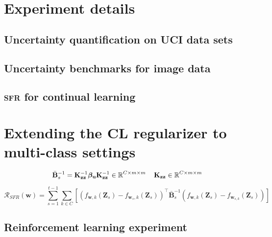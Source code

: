 \documentclass{article}
\newcommand{\our}{\textsc{sfr}\xspace}
\newcommand{\mathbold}[1]{\bm{#1}}
\newcommand{\mbf}[1]{\mathbf{#1}}
\newcommand{\MB}{\mbf{B}}
\newcommand{\MZ}{\mbf{Z}}
\newcommand{\T}{\top}
\newcommand{\vbeta}[0]{\mathbold{\beta}}
\newcommand{\vu}{\mbf{u}}
\newcommand{\vw}{\mbf{w}}
\newcommand{\MKzz}{\mbf{K}_{\mbf{z}\mbf{z}}}
\begin{document}
\section{Experiment details}
\label{app:experiments}


\subsection{Uncertainty quantification on UCI data sets}
\label{app:uci}



\subsection{Uncertainty benchmarks for image data}
\label{app:image}


\subsection{\our for continual learning}
\label{app:cl-experiment}
\section{Extending the CL regularizer to multi-class settings}
\label{sec:cl_multioutput}
\begin{equation}
	\bar{\MB}^{-1}_s = \MKzz^{-1} \vbeta_\vu \MKzz^{-1} \in \R^{C \times m \times m} \quad \MKzz \in \R^{C \times m \times m} 
\end{equation}

\begin{equation}
	\mathcal{R_\textit{SFR}}(\mathbf{w}) = \sum_{s=1}^{t-1}	\sum_{k \in 	C}\left[\left(f_{\vw, k}(\MZ_{s}) - f_{\vw_{s}, k}(\MZ_s) \right)^\T \bar{\MB}^{-1}_{s} \left(f_{\vw, k}(\MZ_{s}) - f_{\vw_{s, k}}(\MZ_s) \right) \right] 
\end{equation}


\subsection{Reinforcement learning experiment}
\label{app:rl-experiment}
\end{document}

